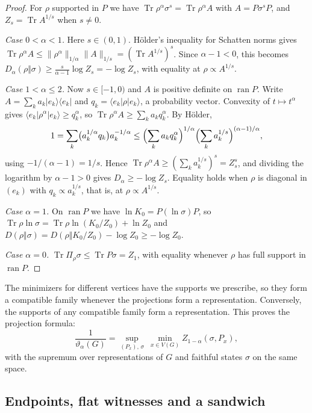 \documentclass[11pt]{article}
\theoremstyle{definition}
\DeclareMathOperator{\Tr}{Tr}
\DeclareMathOperator{\ran}{ran}
\newcommand{\vt}{\vartheta}
\newcommand{\ket}[1]{\lvert #1\rangle}
\newcommand{\bra}[1]{\langle #1\rvert}
\newcommand{\proj}[1]{\ket{#1}\!\bra{#1}}
\newcommand{\nrm}[1]{\lVert #1\rVert}
\begin{document}
\begin{proof}
For $\rho$ supported in $P$ we have
$\Tr\rho^\alpha\sigma^s=\Tr\rho^\alpha A$ with $A=P\sigma^sP$, and
$Z_s=\Tr A^{1/s}$ when $s\ne0$.

\emph{Case $0<\alpha<1$.}  Here $s\in(0,1)$.  H\"older's inequality for
Schatten norms gives
$\Tr\rho^\alpha A\le\nrm{\rho^\alpha}_{1/\alpha}\nrm{A}_{1/s}
=(\Tr A^{1/s})^s$.  Since $\alpha-1<0$, this becomes
$D_\alpha(\rho\Vert\sigma)\ge\frac{s}{\alpha-1}\log Z_s=-\log Z_s$, with
equality at $\rho\propto A^{1/s}$.

\emph{Case $1<\alpha\le2$.}  Now $s\in[-1,0)$ and $A$ is positive definite on
$\ran P$.  Write $A=\sum_ka_k\proj{e_k}$ and $q_k=\bra{e_k}\rho\ket{e_k}$, a
probability vector.  Convexity of $t\mapsto t^\alpha$ gives
$\bra{e_k}\rho^\alpha\ket{e_k}\ge q_k^\alpha$, so
$\Tr\rho^\alpha A\ge\sum_ka_kq_k^\alpha$.  By H\"older,
\[
 1=\sum_k\bigl(a_k^{1/\alpha}q_k\bigr)a_k^{-1/\alpha}
 \le\Bigl(\sum_ka_kq_k^\alpha\Bigr)^{1/\alpha}
    \Bigl(\sum_ka_k^{1/s}\Bigr)^{(\alpha-1)/\alpha},
\]
using $-1/(\alpha-1)=1/s$.  Hence
$\Tr\rho^\alpha A\ge(\sum_ka_k^{1/s})^{s}=Z_s^s$, and dividing the logarithm
by $\alpha-1>0$ gives $D_\alpha\ge-\log Z_s$.  Equality holds when $\rho$ is
diagonal in $(e_k)$ with $q_k\propto a_k^{1/s}$, that is, at
$\rho\propto A^{1/s}$.

\emph{Case $\alpha=1$.}  On $\ran P$ we have
$\ln K_0=P(\ln\sigma)P$, so $\Tr\rho\ln\sigma=\Tr\rho\ln(K_0/Z_0)+\ln Z_0$ and
$D(\rho\Vert\sigma)=D(\rho\Vert K_0/Z_0)-\log Z_0\ge-\log Z_0$.

\emph{Case $\alpha=0$.}  $\Tr\Pi_\rho\sigma\le\Tr P\sigma=Z_1$, with equality
whenever $\rho$ has full support in $\ran P$.
\end{proof}

The minimizers for different vertices have the supports we prescribe, so they
form a compatible family whenever the projections form a representation.
Conversely, the supports of any compatible family form a representation.  This
proves the projection formula:
\begin{equation}\label{eq:projection-formula}
 \frac1{\vt_\alpha(G)}
 =\sup_{(P_x),\,\sigma}\ \min_{x\in V(G)}Z_{1-\alpha}(\sigma,P_x),
\end{equation}
with the supremum over representations of $G$ and faithful states $\sigma$ on
the same space.

\subsection{Endpoints, flat witnesses and a sandwich}
\end{document}
